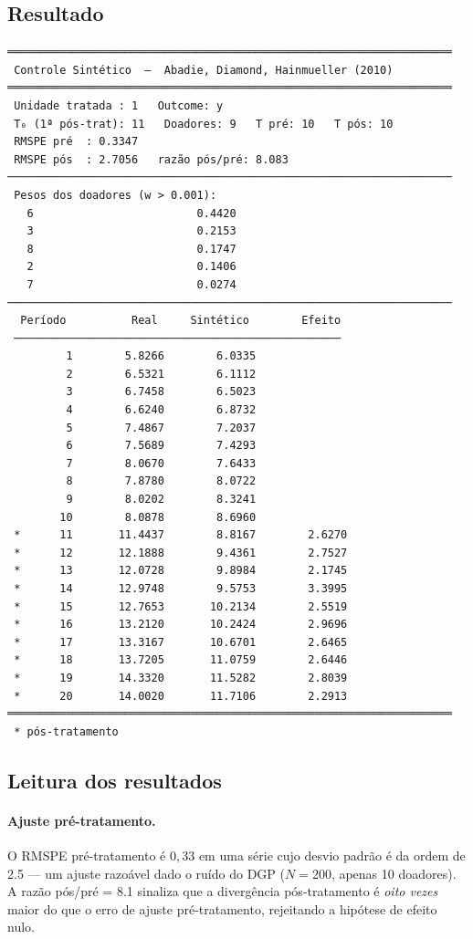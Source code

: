 \subsection*{Resultado}

\begin{lstlisting}[language={}, basicstyle=\ttfamily\small,
  frame=none, numbers=none, backgroundcolor=\color{codbg},
  xleftmargin=0pt, xrightmargin=0pt, breaklines=false]
════════════════════════════════════════════════════════════════════
 Controle Sintético  —  Abadie, Diamond, Hainmueller (2010)
════════════════════════════════════════════════════════════════════
 Unidade tratada : 1   Outcome: y
 T₀ (1ª pós-trat): 11   Doadores: 9   T pré: 10   T pós: 10
 RMSPE pré  : 0.3347
 RMSPE pós  : 2.7056   razão pós/pré: 8.083
────────────────────────────────────────────────────────────────────
 Pesos dos doadores (w > 0.001):
   6                         0.4420
   3                         0.2153
   8                         0.1747
   2                         0.1406
   7                         0.0274
────────────────────────────────────────────────────────────────────
  Período          Real     Sintético        Efeito
 ──────────────────────────────────────────────────
         1        5.8266        6.0335
         2        6.5321        6.1112
         3        6.7458        6.5023
         4        6.6240        6.8732
         5        7.4867        7.2037
         6        7.5689        7.4293
         7        8.0670        7.6433
         8        7.8780        8.0722
         9        8.0202        8.3241
        10        8.0878        8.6960
 *      11       11.4437        8.8167        2.6270
 *      12       12.1888        9.4361        2.7527
 *      13       12.0728        9.8984        2.1745
 *      14       12.9748        9.5753        3.3995
 *      15       12.7653       10.2134        2.5519
 *      16       13.2120       10.2424        2.9696
 *      17       13.3167       10.6701        2.6465
 *      18       13.7205       11.0759        2.6446
 *      19       14.3320       11.5282        2.8039
 *      20       14.0020       11.7106        2.2913
════════════════════════════════════════════════════════════════════
 * pós-tratamento
\end{lstlisting}

\subsection*{Leitura dos resultados}

\paragraph{Ajuste pré-tratamento.}
O RMSPE pré-tratamento é $0{,}33$ em uma série cujo desvio padrão é da
ordem de 2.5 — um ajuste razoável dado o ruído do DGP ($N=200$, apenas
10 doadores). A razão pós/pré = 8.1 sinaliza que a divergência
pós-tratamento é \emph{oito vezes} maior do que o erro de ajuste
pré-tratamento, rejeitando a hipótese de efeito nulo.

